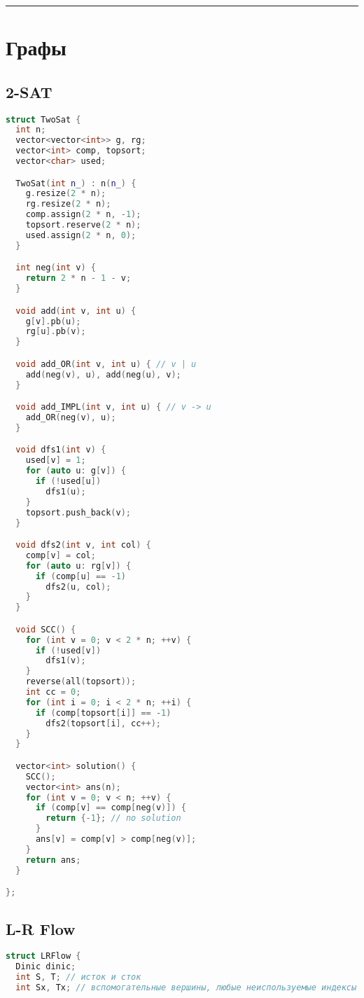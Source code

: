\documentclass[9pt,a4paper,landscape,twosided]{extarticle}
\begin{document}
\begin{multicols*}{3}
\noindent\rule{\linewidth}{0.15mm}

\section{Графы}

\subsection{2-SAT}
\begin{lstlisting}[language=C++]
struct TwoSat {
  int n;
  vector<vector<int>> g, rg;
  vector<int> comp, topsort;
  vector<char> used;

  TwoSat(int n_) : n(n_) {
    g.resize(2 * n);
    rg.resize(2 * n);
    comp.assign(2 * n, -1);
    topsort.reserve(2 * n);
    used.assign(2 * n, 0);
  }

  int neg(int v) {
    return 2 * n - 1 - v;
  }

  void add(int v, int u) {
    g[v].pb(u);
    rg[u].pb(v);
  }

  void add_OR(int v, int u) { // v | u
    add(neg(v), u), add(neg(u), v);
  }

  void add_IMPL(int v, int u) { // v -> u
    add_OR(neg(v), u);
  }

  void dfs1(int v) {
    used[v] = 1;
    for (auto u: g[v]) {
      if (!used[u])
        dfs1(u);
    }
    topsort.push_back(v);
  }

  void dfs2(int v, int col) {
    comp[v] = col;
    for (auto u: rg[v]) {
      if (comp[u] == -1)
        dfs2(u, col);
    }
  }

  void SCC() {
    for (int v = 0; v < 2 * n; ++v) {
      if (!used[v])
        dfs1(v);
    }
    reverse(all(topsort));
    int cc = 0;
    for (int i = 0; i < 2 * n; ++i) {
      if (comp[topsort[i]] == -1)
        dfs2(topsort[i], cc++);
    }
  }

  vector<int> solution() {
    SCC();
    vector<int> ans(n);
    for (int v = 0; v < n; ++v) {
      if (comp[v] == comp[neg(v)]) {
        return {-1}; // no solution
      }
      ans[v] = comp[v] > comp[neg(v)];
    }
    return ans;
  }

};
\end{lstlisting}

\subsection{L-R Flow}
\begin{lstlisting}[language=C++]
struct LRFlow {
  Dinic dinic;
  int S, T; // исток и сток
  int Sx, Tx; // вспомогательные вершины, любые неиспользуемые индексы


\end{lstlisting}
\end{multicols*}
\end{document}
